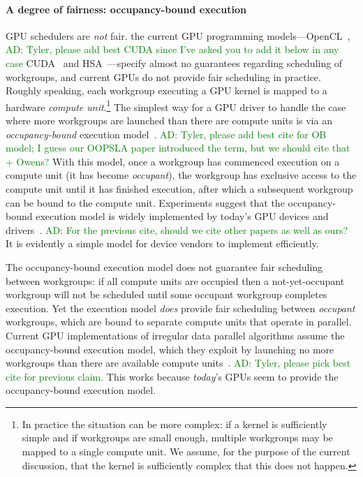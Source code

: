 \documentclass[numbers,nocopyrightspace,10pt]{sigplanconf}
\newcommand{\ADComment}[1]{\textcolor{green}{AD: #1}}
\begin{document}
\paragraph{A degree of fairness: occupancy-bound execution}
GPU schedulers are \emph{not} fair. the current GPU
programming models---OpenCL~\cite{opencl2Spec}, \ADComment{Tyler, please add best CUDA since I've asked you to add it below in any case} CUDA~\cite{...}  and
HSA~\cite{HSAprogramming11}---specify almost no guarantees regarding scheduling of
workgroups, and current GPUs do not
provide fair scheduling in practice.  Roughly speaking, each workgroup
executing a GPU kernel is mapped to a hardware \emph{compute
  unit}.\footnote{In practice the situation can be more complex: if a
  kernel is sufficiently simple and if workgroups are small enough,
  multiple workgroups may be mapped to a single compute unit.  We assume, for the purpose of the current discussion, that the kernel is sufficiently complex that this does not happen.}
%
The simplest way for a GPU driver to handle 
the case where more workgroups are launched than there are compute
units is via an \emph{occupancy-bound}
execution model~\cite{DBLP:conf/oopsla/SorensenDBGR16}. \ADComment{Tyler, please add best cite for OB model; I guess our OOPSLA paper introduced the term, but we should cite that + Owens?}  With this model, once a workgroup has commenced execution on a
compute unit (it has become \emph{occupant}), the workgroup has
exclusive access to the compute unit until it has finished execution,
after which a subsequent workgroup can be bound to the compute unit.
Experiments suggest that the occupancy-bound execution model is widely
implemented by today's GPU devices and drivers~\cite{DBLP:conf/oopsla/SorensenDBGR16}. \ADComment{For the previous cite, should we cite other papers as well as ours?}  It is
evidently a simple model for device vendors to implement efficiently.

The occupancy-bound execution model does not guarantee fair scheduling
between workgroups: if all compute units are occupied then a
not-yet-occupant workgroup will not be scheduled until some occupant
workgroup completes execution.  Yet the execution model \emph{does}
provide fair scheduling between \emph{occupant} workgroups, which are
bound to separate compute units that operate in parallel.  Current GPU
implementations of irregular data parallel algorithms assume the
occupancy-bound execution model, which they exploit by launching 
no more workgroups than there are available compute
units~\cite{...}. \ADComment{Tyler, please pick best cite for previous
  claim.} This works because \emph{today}'s GPUs seem to provide the
occupancy-bound execution model.
\end{document}
